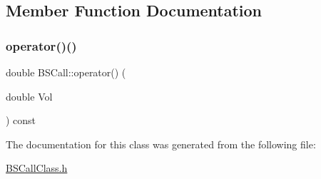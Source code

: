 \subsection{Member Function Documentation}
\hypertarget{classBSCall_a98d2d6613888711c773492520b881e2a}{}\label{classBSCall_a98d2d6613888711c773492520b881e2a} 
\subsubsection{\texorpdfstring{operator()()}{operator()()}}
{\footnotesize\ttfamily double B\+S\+Call\+::operator() (\begin{DoxyParamCaption}\item[{double}]{Vol }\end{DoxyParamCaption}) const}



The documentation for this class was generated from the following file\+:\begin{DoxyCompactItemize}
\item 
\hyperlink{BSCallClass_8h}{B\+S\+Call\+Class.\+h}\end{DoxyCompactItemize}
